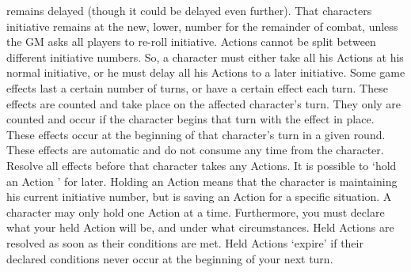 \documentclass[twoside]{book}
\begin{document}
             remains delayed (though it could be delayed even further).
             That characters initiative remains at the new, lower, number
             for the remainder of combat, unless the GM asks all players
             to re-roll initiative. Actions cannot be split between
             different initiative numbers. So, a character must either
             take all his Actions at his normal initiative, or he must
             delay all his Actions to a later initiative. 
   Some game effects last a certain number of turns, or
             have a certain effect each turn. These effects are counted
             and take place on the affected character's turn. They
             only are counted and occur if the character begins that turn
             with the effect in place. These effects occur at the
             beginning of that character's turn in a given round.
             These effects are automatic and do not consume any time from
             the character. Resolve all effects before that character
             takes any Actions. 
   It is possible to `hold an Action ' for
             later. Holding an Action means that the character is
             maintaining his current initiative number, but is saving an
             Action for a specific situation. A character may only hold
             one Action at a time. Furthermore, you must declare what
             your held Action will be, and under what circumstances. Held
             Actions are resolved as soon as their conditions are met.
             Held Actions `expire' if their declared
             conditions never occur at the beginning of your next turn.
             
\end{document}
